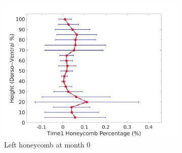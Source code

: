 \begin{figure}[H]
\begin{subfigure}{.42\linewidth}
  \includegraphics[width=\linewidth,trim={{.0\wd0} {.0\wd0} {.0\wd0} {.0\wd0}},clip]{QuantitativeAnalysis/Image/LeftLungHoneycombDiseaseDorsoToVentralTime1.jpg} %
  \caption{Left honeycomb at month 0}
  \label{fig:DiseaseDorsoToVentralTime1-e} 
\end{subfigure} 
\begin{subfigure}{.42\linewidth}%

\end{subfigure}
\end{figure}
